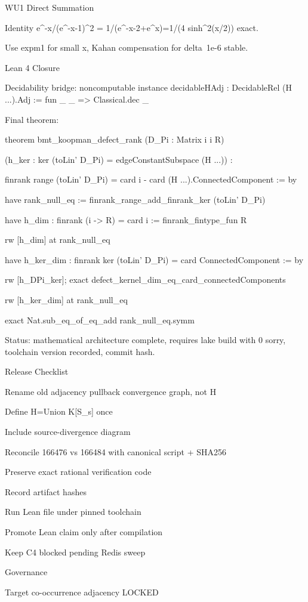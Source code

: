 WU1 Direct Summation

Identity e^{-x}/(e^{-x}-1)^2 = 1/(e^{-x}-2+e^x)=1/(4 sinh^2(x/2)) exact.

Use expm1 for small x, Kahan compensation for delta~1e-6 stable.


Lean 4 Closure

Decidability bridge: noncomputable instance decidableHAdj : DecidableRel (H ...).Adj := fun _ _ => Classical.dec _


Final theorem:


theorem bmt_koopman_defect_rank (D_Pi : Matrix i i R)

(h_ker : ker (toLin' D_Pi) = edgeConstantSubspace (H ...)) :

finrank range (toLin' D_Pi) = card i - card (H ...).ConnectedComponent := by

have rank_null_eq := finrank_range_add_finrank_ker (toLin' D_Pi)

have h_dim : finrank (i -> R) = card i := finrank_fintype_fun R

rw [h_dim] at rank_null_eq

have h_ker_dim : finrank ker (toLin' D_Pi) = card ConnectedComponent := by

rw [h_DPi_ker]; exact defect_kernel_dim_eq_card_connectedComponents

rw [h_ker_dim] at rank_null_eq

exact Nat.sub_eq_of_eq_add rank_null_eq.symm


Status: mathematical architecture complete, requires lake build with 0 sorry, toolchain version recorded, commit hash.


Release Checklist

Rename old adjacency pullback convergence graph, not H

Define H=Union K[S_s] once

Include source-divergence diagram

Reconcile 166476 vs 166484 with canonical script + SHA256

Preserve exact rational verification code

Record artifact hashes

Run Lean file under pinned toolchain

Promote Lean claim only after compilation

Keep C4 blocked pending Redis sweep

Governance

Target co-occurrence adjacency LOCKED

